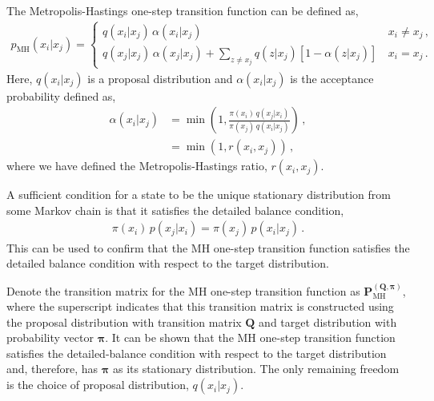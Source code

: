 \documentclass{article}
\begin{document}
The Metropolis-Hastings one-step transition function can be defined as,
\begin{align}
    p_{\text{MH}}(x_i | x_j) =
    \begin{cases}
        q(x_i | x_j) \, \alpha(x_i | x_j) \,                                                                  & x_i \neq x_j \,, \\
        q(x_j | x_j) \, \alpha(x_j | x_j) + \sum_{z \neq x_j} q(z | x_j)\left[ 1 - \alpha(z | x_j) \right] \, & x_i = x_j \,.
    \end{cases}
    \label{eq:mh_one_step_transition_function_cases}
\end{align}
Here, $q(x_i | x_j)$ is a proposal distribution and $\alpha(x_i | x_j)$ is the acceptance probability defined as,
\begin{align}
    \label{eq:mh_acceptance_probability}
    \alpha(x_i | x_j) & = \min\left(1, \frac{\pi(x_i) \, q(x_j | x_i)}{\pi(x_j) \, q(x_i | x_j)}\right)\,, \\
                      & = \min\left(1, r(x_i, x_j)\right) \nonumber\,,
\end{align}
where we have defined the Metropolis-Hastings ratio, $r(x_i, x_j)$.

A sufficient condition for a state to be the unique stationary distribution from some Markov chain is that it satisfies the detailed balance condition,
\begin{align}
    \pi(x_i) \, p(x_j | x_i) = \pi(x_j) \, p(x_i | x_j) \,.
    \label{eq:detailed_balance}
\end{align}
This can be used to confirm that the MH one-step transition function satisfies the detailed balance condition with respect to the target distribution.

Denote the transition matrix for the MH one-step transition function as $\mathbf{P}_{\text{MH}}^{(\mathbf{Q}, \bm{\pi})}$, where the superscript indicates that this transition matrix is constructed using the proposal distribution with transition matrix $\mathbf{Q}$ and target distribution with probability vector $\bm{\pi}$. It can be
shown that the MH one-step transition function satisfies the detailed-balance condition with respect to the target distribution and, therefore, has $\bm{\pi}$ as its stationary distribution. The only
remaining freedom is the choice of proposal distribution, $q(x_i | x_j)$.
\end{document}
